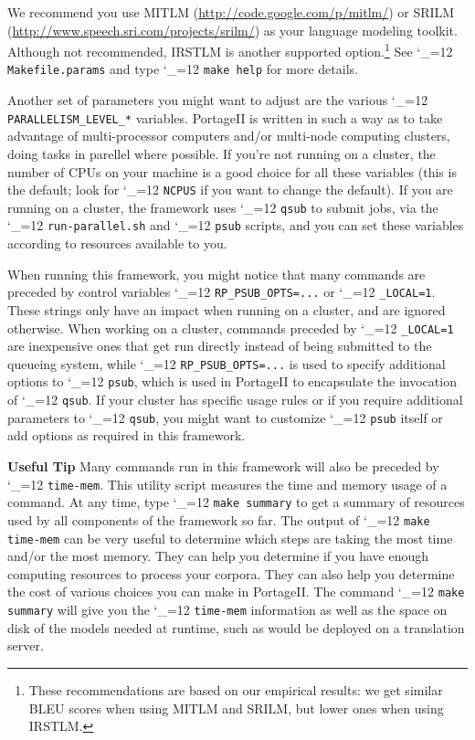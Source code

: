 \documentclass[11pt,letterpaper]{article}
\newcommand{\PS}{PortageII\xspace}
\def\code{\begingroup\catcode`\_=12 \codex}
\newcommand{\codex}[1]{\texttt{#1}\endgroup}
\newcommand{\tip}{\textbf{Useful Tip \large{\ding{43}} }}
\newcommand{\margintip}{\marginpar[{\textbf{Tip \large{\ding{43}}}}]{\textbf{\reflectbox{\large{\ding{43}}} Tip}}}
\newcommand{\tipend}{\textbf{ \reflectbox{\large{\ding{43}}}}}
\begin{document}
We recommend you use MITLM (\url{http://code.google.com/p/mitlm/}) or SRILM
(\url{http://www.speech.sri.com/projects/srilm/}) as your language modeling
toolkit.  Although not recommended, IRSTLM is another supported
option.\footnote{These recommendations are based on our
empirical results: we get similar BLEU scores when using MITLM and SRILM, but
lower ones when using IRSTLM.} See \code{Makefile.params} and type \code{make
help} for more details.

Another set of parameters you might want to adjust are the various
\code{PARALLELISM_LEVEL_*} variables.  \PS is written in such a way as to take
advantage of multi-processor computers and/or multi-node computing clusters,
doing tasks in parellel where possible.  If you're not running on a cluster,
the number of CPUs on your machine is a good choice for all these variables
(this is the default; look for \code{NCPUS} if you want to change the default).
If you are running on a cluster, the framework uses
\code{qsub} to submit jobs, via the \code{run-parallel.sh} and \code{psub}
scripts, and you can set these variables according to resources available to
you.

When running this framework, you might notice that many commands are preceded
by control variables \code{RP_PSUB_OPTS=...} or \code{_LOCAL=1}.  These strings
only have an impact when running on a cluster, and are ignored otherwise.  When
working on a cluster, commands preceded by \code{_LOCAL=1} are inexpensive ones
that get run directly instead of being submitted to the queueing system, while
\code{RP_PSUB_OPTS=...} is used to specify additional options to \code{psub},
which is used in \PS to encapsulate the invocation of \code{qsub}.  If your
cluster has specific usage rules or if you require additional parameters to
\code{qsub}, you might want to customize \code{psub} itself or add options as
required in this framework.

\tip\margintip Many commands run in this framework will also be preceded by
\code{time-mem}. This utility script measures the time and memory usage of a
command.  At any time, type \code{make summary} to get a summary of resources
used by all components of the framework so far.  The output of \code{make
time-mem} can be very useful to determine which steps are taking the most time
and/or the most memory.  They can help you determine if you have enough
computing resources to process your corpora.  They can also help you determine
the cost of various choices you can make in \PS.  The command \code{make
summary} will give you the \code{time-mem} information as well as the space on
disk of the models needed at runtime, such as would be deployed on a
translation server.\tipend
\end{document}
